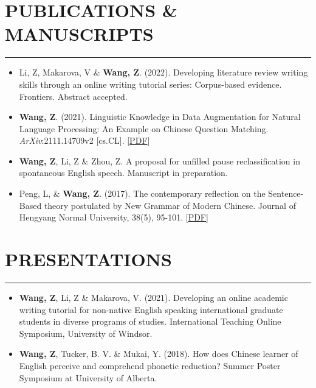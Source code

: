 \documentclass[a4paper, 11pt]{article}  %
\begin{document}
\section*{PUBLICATIONS \& MANUSCRIPTS} %
\hrule 
\vspace{11pt}

\begin{itemize}
	\itemsep0em 
	
	\item{Li, Z, Makarova, V \& \textbf{Wang, Z}. (2022). Developing literature review writing skills through an online writing tutorial series: Corpus-based evidence. Frontiers. Abstract accepted.}
	\item{\textbf{Wang, Z}. (2021). Linguistic Knowledge in Data Augmentation for Natural Language Processing: An Example on Chinese Question Matching. \emph{ArXiv}:2111.14709v2 [cs.CL]. [\href{https://arxiv.org/pdf/2111.14709.pdf}{PDF}]}
	\item{\textbf{Wang, Z}, Li, Z \& Zhou, Z. A proposal for unfilled pause reclassification in spontaneous English speech. Manuscript in preparation.}
	\item{Peng, L, \& \textbf{Wang, Z}. (2017). The contemporary reflection on the Sentence-Based theory postulated by New Grammar of Modern Chinese. Journal of Hengyang Normal University, 38(5), 95-101. [\href{https://www.researchgate.net/publication/340730935_The_contemporary_reflection_on_the_Sentence-Based_theory_postulated_by_New_Grammar_of_Modern_Chinese}{PDF}]}
	
\end{itemize}

\section*{PRESENTATIONS}
\hrule 
\vspace{11pt}

\begin{itemize}
	\itemsep0em 
	
	\item{\textbf{Wang, Z}, Li, Z \& Makarova, V. (2021). Developing an online academic writing tutorial for non-native English speaking international graduate students in diverse programs of studies. International Teaching Online Symposium, University of Windsor.}
		
	\item{\textbf{Wang, Z}, Tucker, B. V. \& Mukai, Y. (2018). How does Chinese learner of English perceive and comprehend phonetic reduction? Summer Poster Symposium at University of Alberta.}
	
\end{itemize}
\end{document}
